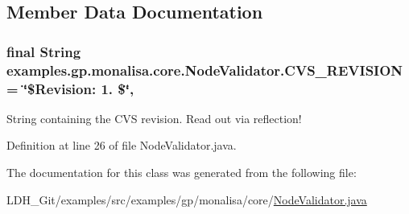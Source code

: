 \subsection{Member Data Documentation}
\hypertarget{classexamples_1_1gp_1_1monalisa_1_1core_1_1_node_validator_adab02c56089f3f094c8314ef5db9dd43}{
\subsubsection[{C\-V\-S\-\_\-\-R\-E\-V\-I\-S\-I\-O\-N}]{\setlength{\rightskip}{0pt plus 5cm}final String examples.\-gp.\-monalisa.\-core.\-Node\-Validator.\-C\-V\-S\-\_\-\-R\-E\-V\-I\-S\-I\-O\-N = \char`\"{}\$Revision\-: 1. \$\char`\"{}\hspace{0.3cm}{\ttfamily [static]}, {\ttfamily [private]}}}\label{classexamples_1_1gp_1_1monalisa_1_1core_1_1_node_validator_adab02c56089f3f094c8314ef5db9dd43}
String containing the C\-V\-S revision. Read out via reflection! 

Definition at line 26 of file Node\-Validator.\-java.



The documentation for this class was generated from the following file\-:\begin{DoxyCompactItemize}
\item 
L\-D\-H\-\_\-\-Git/examples/src/examples/gp/monalisa/core/\hyperlink{_node_validator_8java}{Node\-Validator.\-java}\end{DoxyCompactItemize}
